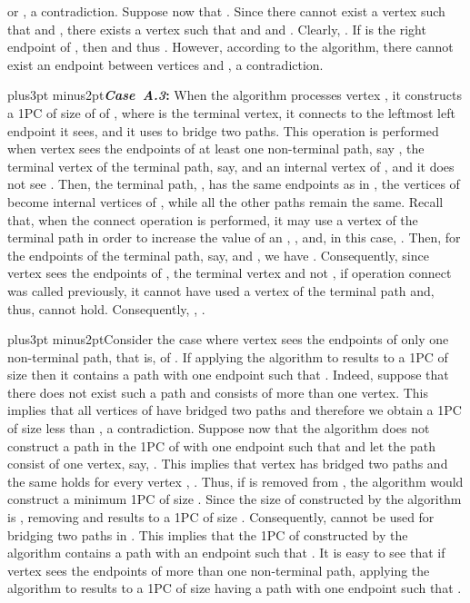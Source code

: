 \documentclass[10pt]{article}
\def\yskip{\penalty-50\vskip3pt plus3pt minus2pt}
\def\y{\yskip}
\begin{document}
{or
,
a contradiction. Suppose now that . Since there
cannot exist a vertex  such that  and
, there exists a
vertex  such that  and
 and . Clearly, . If  is the right endpoint
of , then  and thus . However, according to
the algorithm, there cannot exist an endpoint between vertices
 and , a contradiction.

\y {\bf \textit{Case~A.3}:} When the algorithm processes vertex
, it constructs a 1PC of size  of
 of , where 
is the terminal vertex, it connects  to the leftmost left
endpoint it sees, and it uses  to bridge two paths. This
operation is performed when vertex  sees the endpoints of at
least one non-terminal path, say , the
terminal vertex  of the terminal path, say,  and an internal vertex  of , and it
does not see . Then, the terminal path, , has the
same endpoints as in , the
vertices of  become internal vertices of , while all the
other paths remain the same. Recall that, when the connect
operation is performed, it may use a vertex of the terminal path
in order to increase the value of an , , and, in this case,
. Then, for the
endpoints of the terminal path, say,  and
, we have . Consequently, since vertex 
sees the endpoints of , the terminal vertex  and not
, if operation connect was called previously, it cannot
have used a vertex of the terminal path and, thus,
 cannot hold.
Consequently, ,
.

\y Consider the case where vertex  sees the endpoints of only
one non-terminal path, that is, of . If applying the
algorithm to  results to a 1PC of size
 then it contains a path with one
endpoint  such that . Indeed, suppose that there does
not exist such a path and  consists of more than one vertex.
This implies that all vertices of  have bridged two paths and
therefore we obtain a 1PC of size less than
, a contradiction. Suppose now that
the algorithm does not construct a path in the 1PC of 
with one endpoint  such that  and let the path 
consist of one vertex, say, . This implies that vertex
 has bridged two paths and the same holds for every vertex
, . Thus, if  is removed from
, the algorithm would construct a minimum 1PC of size
. Since the size of
 constructed by the algorithm is
, removing  and  results
to a 1PC of size . Consequently,
 cannot be used for bridging two paths in
. This implies that the 1PC
of  constructed by the algorithm contains a path with an
endpoint  such that . It is easy to see that if vertex
 sees the endpoints of more than one non-terminal path,
applying the algorithm to  results to a 1PC of size
 having a path with one endpoint
 such that .

}
\end{document}
